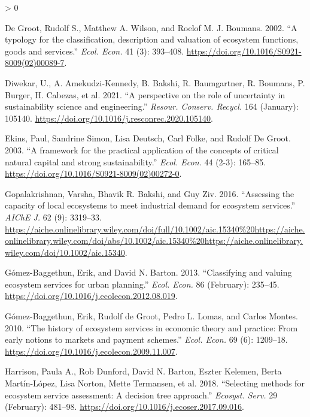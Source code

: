\documentclass[
  14pt,
]{extarticle}
\newlength{\cslhangindent}
\newenvironment{CSLReferences}[2] %
 {%
  \setlength{\parindent}{0pt}
  \ifodd #1 \everypar{\setlength{\hangindent}{\cslhangindent}}\ignorespaces\fi
  \ifnum #2 > 0
  \setlength{\parskip}{#2\baselineskip}
  \fi
 }%
 {}
\begin{document}
\begin{CSLReferences}{1}{0}
\leavevmode\hypertarget{ref-DeGroot2002}{}%
De Groot, Rudolf S., Matthew A. Wilson, and Roelof M. J. Boumans. 2002. {``{A typology for the classification, description and valuation of ecosystem functions, goods and services}.''} \emph{Ecol. Econ.} 41 (3): 393--408. \url{https://doi.org/10.1016/S0921-8009(02)00089-7}.

\leavevmode\hypertarget{ref-Diwekar2021}{}%
Diwekar, U., A. Amekudzi-Kennedy, B. Bakshi, R. Baumgartner, R. Boumans, P. Burger, H. Cabezas, et al. 2021. {``{A perspective on the role of uncertainty in sustainability science and engineering}.''} \emph{Resour. Conserv. Recycl.} 164 (January): 105140. \url{https://doi.org/10.1016/j.resconrec.2020.105140}.

\leavevmode\hypertarget{ref-Ekins2003}{}%
Ekins, Paul, Sandrine Simon, Lisa Deutsch, Carl Folke, and Rudolf De Groot. 2003. {``{A framework for the practical application of the concepts of critical natural capital and strong sustainability}.''} \emph{Ecol. Econ.} 44 (2-3): 165--85. \url{https://doi.org/10.1016/S0921-8009(02)00272-0}.

\leavevmode\hypertarget{ref-Gopalakrishnan2016}{}%
Gopalakrishnan, Varsha, Bhavik R. Bakshi, and Guy Ziv. 2016. {``{Assessing the capacity of local ecosystems to meet industrial demand for ecosystem services}.''} \emph{AIChE J.} 62 (9): 3319--33. \url{https://aiche.onlinelibrary.wiley.com/doi/full/10.1002/aic.15340\%20https://aiche.onlinelibrary.wiley.com/doi/abs/10.1002/aic.15340\%20https://aiche.onlinelibrary.wiley.com/doi/10.1002/aic.15340}.

\leavevmode\hypertarget{ref-Gomez-Baggethun2013}{}%
Gómez-Baggethun, Erik, and David N. Barton. 2013. {``{Classifying and valuing ecosystem services for urban planning}.''} \emph{Ecol. Econ.} 86 (February): 235--45. \url{https://doi.org/10.1016/j.ecolecon.2012.08.019}.

\leavevmode\hypertarget{ref-Gomez-Baggethun2010}{}%
Gómez-Baggethun, Erik, Rudolf de Groot, Pedro L. Lomas, and Carlos Montes. 2010. {``{The history of ecosystem services in economic theory and practice: From early notions to markets and payment schemes}.''} \emph{Ecol. Econ.} 69 (6): 1209--18. \url{https://doi.org/10.1016/j.ecolecon.2009.11.007}.

\leavevmode\hypertarget{ref-Harrison2018}{}%
Harrison, Paula A., Rob Dunford, David N. Barton, Eszter Kelemen, Berta Martín-López, Lisa Norton, Mette Termansen, et al. 2018. {``{Selecting methods for ecosystem service assessment: A decision tree approach}.''} \emph{Ecosyst. Serv.} 29 (February): 481--98. \url{https://doi.org/10.1016/j.ecoser.2017.09.016}.


\end{CSLReferences}
\end{document}
